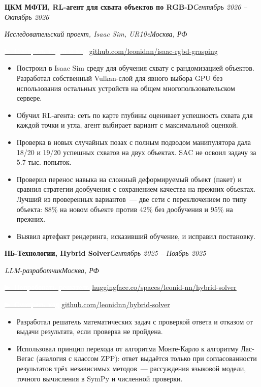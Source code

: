 \documentclass[10pt,a4paper]{article}
\newcommand{\entry}[4]{%
  \par\noindent\textbf{#1}\hfill\textit{#2}\par
  \noindent\textit{#3}\hfill\textit{#4}\par\vspace{2pt}}
\newcommand{\entrygap}{\par\vspace{0.5cm}}
\newcommand{\projlink}[3]{%
  \par\noindent\href{#1}{\colorbox{linkbtn}{\textcolor{white}{\small\textbf{▶~#2}}}}%
  \hspace{6pt}\href{#1}{\small\underline{#3}}\par\vspace{3pt}}
\begin{document}
\entry{ЦКМ МФТИ, RL-агент для схвата объектов по RGB-D}{Сентябрь 2026 -- Октябрь 2026}{Исследовательский проект, Isaac Sim, UR10e}{Москва, РФ}
\projlink{https://github.com/leonidnn/isaac-rgbd-grasping}{Смотреть видео и код}{github.com/leonidnn/isaac-rgbd-grasping}
\begin{itemize}[leftmargin=*,nosep]
\item Построил в Isaac Sim среду для обучения схвату с рандомизацией объектов. Разработал собственный Vulkan-слой для явного выбора GPU без использования остальных устройств на общем многопользовательском сервере.
\item Обучил RL-агента: сеть по карте глубины оценивает успешность схвата для каждой точки и угла, агент выбирает вариант с максимальной оценкой.
\item Проверка в новых случайных позах с полным подводом манипулятора дала 18/20 и 19/20 успешных схватов на двух объектах. SAC не освоил задачу за 5.7 тыс. попыток.
\item Проверил перенос навыка на сложный деформируемый объект (пакет) и сравнил стратегии дообучения с сохранением качества на прежних объектах. Лучший из проверенных вариантов~--- две сети с переключением по типу объекта: 88\% на новом объекте против 42\% без дообучения и 95\% на прежних.
\item Выявил артефакт рендеринга, исказивший обучение, и исправил постановку.
\end{itemize}

\entrygap

\entry{НБ-Технологии, Hybrid Solver}{Сентябрь 2025 -- Ноябрь 2025}{LLM-разработчик}{Москва, РФ}
\projlink{https://huggingface.co/spaces/leonid-nn/hybrid-solver}{Попробовать решатель}{huggingface.co/spaces/leonid-nn/hybrid-solver}
\projlink{https://github.com/leonidnn/hybrid-solver}{Смотреть код}{github.com/leonidnn/hybrid-solver}
\begin{itemize}[leftmargin=*,nosep]
\item Разработал решатель математических задач с проверкой ответа и отказом от выдачи результата, если проверка не пройдена.
\item Использовал принцип перехода от алгоритма Монте-Карло к алгоритму Лас-Вегас (аналогия с классом ZPP): ответ выдаётся только при согласованности результатов трёх независимых методов~--- рассуждения языковой модели, точного вычисления в SymPy и численной проверки.
\end{itemize}

\entrygap
\end{document}
